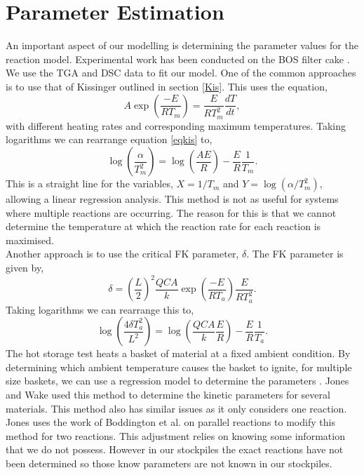 
\section{Parameter Estimation}
An important aspect of our modelling is determining the parameter values for the reaction model. Experimental work has been conducted on the BOS filter cake \cite{Ray19,ray20}. We use the TGA and DSC data to fit our model. One of the common approaches is to use that of Kissinger \cite{kissinger56} outlined in section \ref{Kis}. This uses the equation,
\begin{equation}
A\exp\left(\frac{-E}{RT_m}\right)=\frac{E}{RT_m^2}\frac{dT}{dt}, \label{eqkis}
\end{equation}
with different heating rates and corresponding maximum temperatures. Taking logarithms we can rearrange equation \ref{eqkis} to,
\begin{equation}
\log\left(\frac{\alpha}{T_m^2}\right)=\log\left(\frac{AE}{R}\right)-\frac{E}{R}\frac{1}{T_m}.
\end{equation}
This is a straight line for the variables, $X=1/T_m$ and $Y=\log\left(\alpha/{T_m^2}\right)$, allowing a linear regression analysis. This method is not as useful for systems where multiple reactions are occurring. The reason for this is that we cannot determine the temperature at which the reaction rate for each reaction is maximised.\\
Another approach is to use the critical FK parameter, $\delta$. The FK parameter is given by,
\begin{equation}
\delta=\left(\frac{L}{2}\right)^2\frac{QCA}{k}\exp\left(\frac{-E}{RT_a}\right)\frac{E}{RT_a^2}.
\end{equation} 
Taking logarithms we can rearrange this to,
\begin{equation}
\log\left(\frac{4 \delta T_a^2}{L^2}\right)=\log\left(\frac{QCA}{k} \frac{E}{R}\right)-\frac{E}{R}\frac{1}{T_a}. 
\end{equation}
The hot storage test heats a basket of material at a fixed ambient condition. By determining which ambient temperature causes the basket to ignite, for multiple size baskets, we can use a regression model to determine the parameters \cite{gray84}. Jones and Wake \cite{jones90} used this method to determine the kinetic parameters for several materials. This method also has similar issues as it only considers one reaction. Jones \cite{jones92} uses the work of Boddington et al. \cite{bodd84} on parallel reactions to modify this method for two reactions. This adjustment relies on knowing some information that we do not possess. However in our stockpiles the exact reactions have not been determined so those know parameters are not known in our stockpiles.\\

